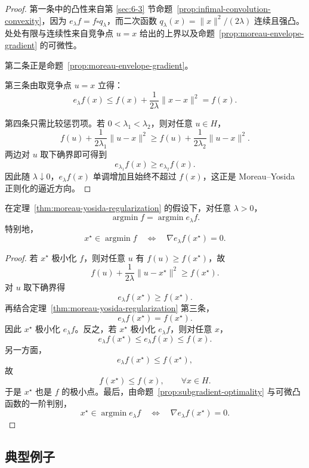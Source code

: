 \begin{proof}
第一条中的凸性来自第 \ref{sec:6-3} 节命题~\ref{prop:infimal-convolution-convexity}，因为 $e_\lambda f=f\square q_\lambda$，而二次函数 $q_\lambda(x)=\|x\|^2/(2\lambda)$ 连续且强凸。处处有限与连续性来自竞争点 $u=x$ 给出的上界以及命题~\ref{prop:moreau-envelope-gradient} 的可微性。

第二条正是命题~\ref{prop:moreau-envelope-gradient}。

第三条由取竞争点 $u=x$ 立得：
\[
e_\lambda f(x)
\le
f(x)+\frac{1}{2\lambda}\|x-x\|^2
=
f(x).
\]

第四条只需比较惩罚项。若 $0<\lambda_1<\lambda_2$，则对任意 $u\in H$，
\[
f(u)+\frac{1}{2\lambda_1}\|u-x\|^2
\ge
f(u)+\frac{1}{2\lambda_2}\|u-x\|^2.
\]
两边对 $u$ 取下确界即可得到
\[
e_{\lambda_1}f(x)\ge e_{\lambda_2}f(x).
\]
因此随 $\lambda\downarrow 0$，$e_\lambda f(x)$ 单调增加且始终不超过 $f(x)$，这正是 Moreau--Yosida 正则化的逼近方向。
\end{proof}

\begin{corollary}\label{cor:moreau-envelope-minimizers}
在定理~\ref{thm:moreau-yosida-regularization} 的假设下，对任意 $\lambda>0$，
\[
\operatorname*{argmin} f
=
\operatorname*{argmin} e_\lambda f.
\]
特别地，
\[
x^\star\in \operatorname*{argmin} f
\quad\Longleftrightarrow\quad
\nabla e_\lambda f(x^\star)=0.
\]
\end{corollary}

\begin{proof}
若 $x^\star$ 极小化 $f$，则对任意 $u$ 有 $f(u)\ge f(x^\star)$，故
\[
f(u)+\frac{1}{2\lambda}\|u-x^\star\|^2\ge f(x^\star).
\]
对 $u$ 取下确界得
\[
e_\lambda f(x^\star)\ge f(x^\star).
\]
再结合定理~\ref{thm:moreau-yosida-regularization} 第三条，
\[
e_\lambda f(x^\star)=f(x^\star).
\]
因此 $x^\star$ 极小化 $e_\lambda f$。反之，若 $x^\star$ 极小化 $e_\lambda f$，则对任意 $x$，
\[
e_\lambda f(x^\star)\le e_\lambda f(x)\le f(x).
\]
另一方面，
\[
e_\lambda f(x^\star)\le f(x^\star),
\]
故
\[
f(x^\star)\le f(x),\qquad \forall x\in H.
\]
于是 $x^\star$ 也是 $f$ 的极小点。最后，由命题~\ref{prop:subgradient-optimality} 与可微凸函数的一阶判别，
\[
x^\star\in \operatorname*{argmin} e_\lambda f
\quad\Longleftrightarrow\quad
\nabla e_\lambda f(x^\star)=0.
\]
\end{proof}

\subsection{典型例子}

